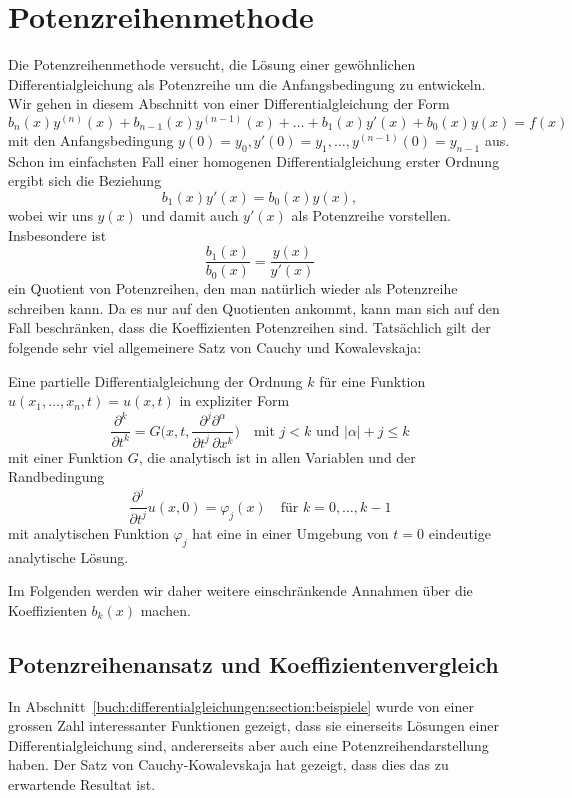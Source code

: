 %
%
%
\section{Potenzreihenmethode
\label{buch:differentialgleichungen:section:potenzreihenmethode}}
Die Potenzreihenmethode versucht, die Lösung einer gewöhnlichen
Differentialgleichung als Potenzreihe um die Anfangsbedingung zu
entwickeln.
%
Wir gehen in diesem Abschnitt von einer Differentialgleichung der
Form
\begin{equation}
b_n(x)y^{(n)}(x)
+
b_{n-1}(x)y^{(n-1)}(x)
+
\dots
+
b_1(x)y'(x)
+
b_0(x)y(x)
=
f(x)
\label{buch:differentialgleichungen:eqn:potenzreihendgl}
\end{equation}
mit den Anfangsbedingung $y(0)=y_0, y'(0)=y_1,\dots,y^{(n-1)}(0)=y_{n-1}$ aus.
Schon im einfachsten Fall einer homogenen Differentialgleichung erster
Ordnung ergibt sich die Beziehung
\[
b_1(x) y'(x) = b_0(x)y(x),
\]
wobei wir uns $y(x)$ und damit auch $y'(x)$ als Potenzreihe vorstellen.
Insbesondere ist 
\[
\frac{b_1(x)}{b_0(x)} = \frac{y(x)}{y'(x)}
\]
ein Quotient von Potenzreihen, den man natürlich wieder als 
Potenzreihe schreiben kann.
Da es nur auf den Quotienten ankommt, kann man sich auf den Fall
beschränken, dass die Koeffizienten Potenzreihen sind.
Tatsächlich gilt der folgende sehr viel allgemeinere Satz von
Cauchy und Kowalevskaja:

\begin{satz}
%
%
Eine partielle Differentialgleichung der Ordnung $k$ für eine
Funktion $u(x_1,\dots,x_n,t)=u(x,t)$ 
in expliziter Form
\[
\frac{\partial^k}{\partial t^k}
=
G\biggl(x,t,
\frac{\partial^j\partial^\alpha}{\partial t^j\,\partial x^k}
\biggr)
\quad\text{mit $j<k$ und $|\alpha|+j\le k$}
\]
mit einer Funktion $G$, die analytisch ist in allen Variablen
und der Randbedingung
\[
\frac{\partial^j}{\partial t^j}u(x,0)
=
\varphi_j(x)\quad\text{für $k=0,\dots,k-1$}
\]
mit analytischen Funktion $\varphi_j$ hat eine in einer Umgebung von 
$t=0$ eindeutige analytische Lösung.
\end{satz}

Im Folgenden werden wir daher weitere einschränkende Annahmen über
die Koeffizienten $b_k(x)$ machen.

%
%
\subsection{Potenzreihenansatz und Koeffizientenvergleich}
In Abschnitt~\ref{buch:differentialgleichungen:section:beispiele}
wurde von einer grossen Zahl interessanter Funktionen gezeigt, dass
sie einerseits Lösungen einer Differentialgleichung sind, 
andererseits aber auch eine Potenzreihendarstellung haben.
Der Satz von Cauchy-Kowalevskaja hat gezeigt, dass dies das zu
erwartende Resultat ist.

